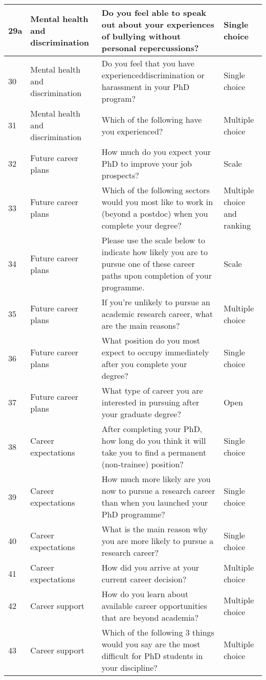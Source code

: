 \documentclass[
]{article}
\begin{document}
\begin{tabular}{l|l|l|l}
\hline
29a & Mental health and discrimination & Do you feel able to speak out about your experiences of bullying without personal repercussions? & Single choice\\
\hline
30 & Mental health and discrimination & Do you feel that you have experienceddiscrimination or harassment in your PhD program? & Single choice\\
\hline
31 & Mental health and discrimination & Which of the following have you experienced? & Multiple choice\\
\hline
32 & Future career plans & How much do you expect your PhD to improve your job prospects? & Scale\\
\hline
33 & Future career plans & Which of the following sectors would you most like to work in (beyond a postdoc) when you complete your degree? & Multiple choice and ranking\\
\hline
34 & Future career plans & Please use the scale below to indicate how likely you are to pursue one of these career paths upon completion of your programme. & Scale\\
\hline
35 & Future career plans & If you’re unlikely to pursue an academic research career, what are the main reasons? & Multiple choice\\
\hline
36 & Future career plans & What position do you most expect to occupy immediately after you complete your degree? & Single choice\\
\hline
37 & Future career plans & What type of career you are interested in pursuing after your graduate degree? & Open\\
\hline
38 & Career expectations & After completing your PhD, how long do you think it will take you to find a permanent (non-trainee) position? & Single choice\\
\hline
39 & Career expectations & How much more likely are you now to pursue a research career than when you launched your PhD programme? & Single choice\\
\hline
40 & Career expectations & What is the main reason why you are more likely to pursue a research career? & Single choice\\
\hline
41 & Career expectations & How did you arrive at your current career decision? & Multiple choice\\
\hline
42 & Career support & How do you learn about available career opportunities that are beyond academia? & Multiple choice\\
\hline
43 & Career support & Which of the following 3 things would you say are the most difficult for PhD students in your discipline? & Multiple choice\\

\end{tabular}
\end{document}
